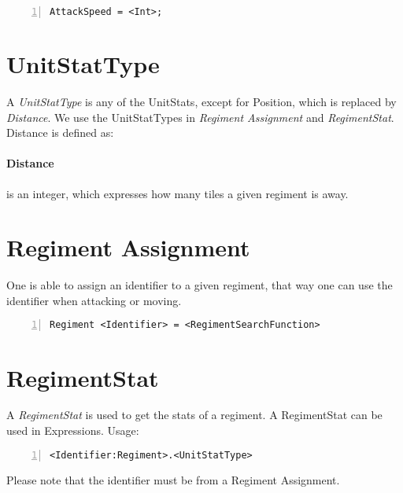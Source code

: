 		\begin{lstlisting}[basicstyle=\small\sffamily,
		keywordstyle={\color{blue}},
		comment={[l]{//}}, morecomment={[s]{/*}{*/}}, commentstyle=\itshape,
		columns={[l]flexible}, numbers=left, numberstyle=\tiny,
		frameround=fftt, frame=shadowbox, captionpos=b,
		caption={AttackSpeed of the regiment}]
AttackSpeed = <Int>;
			\end{lstlisting}

\section{UnitStatType}
	A {\it UnitStatType} is any of the UnitStats, except for Position, which is replaced by {\it Distance}. We use the UnitStatTypes in 
	{\it Regiment Assignment} and {\it RegimentStat}.
	Distance is defined as:
	\paragraph{Distance} is an integer, which expresses how many tiles a given regiment is away.

\section{Regiment Assignment}
\label{doc:regass}
	One is able to assign an identifier to a given regiment, that way one can use the identifier when attacking or moving.
	
		\begin{lstlisting}[basicstyle=\small\sffamily, keywordstyle={\color{blue}}, comment={[l]{//}}, morecomment={[s]{/*}{*/}}, commentstyle=\itshape, columns={[l]flexible}, numbers=left, numberstyle=\tiny, frameround=fftt, frame=shadowbox, captionpos=b,
		caption={Regiment Assignment}]
Regiment <Identifier> = <RegimentSearchFunction>			
		\end{lstlisting}	

\section{RegimentStat}
	A {\it RegimentStat} is used to get the stats of a regiment. A RegimentStat can be used in Expressions. Usage:\\

		\begin{lstlisting}[basicstyle=\small\sffamily,
		keywordstyle={\color{blue}},
		comment={[l]{//}}, morecomment={[s]{/*}{*/}}, commentstyle=\itshape,
		columns={[l]flexible}, numbers=left, numberstyle=\tiny,
		frameround=fftt, frame=shadowbox, captionpos=b,
		caption={Regiment Stat}]
<Identifier:Regiment>.<UnitStatType>
	\end{lstlisting}
	Please note that the identifier must be from a Regiment Assignment.

